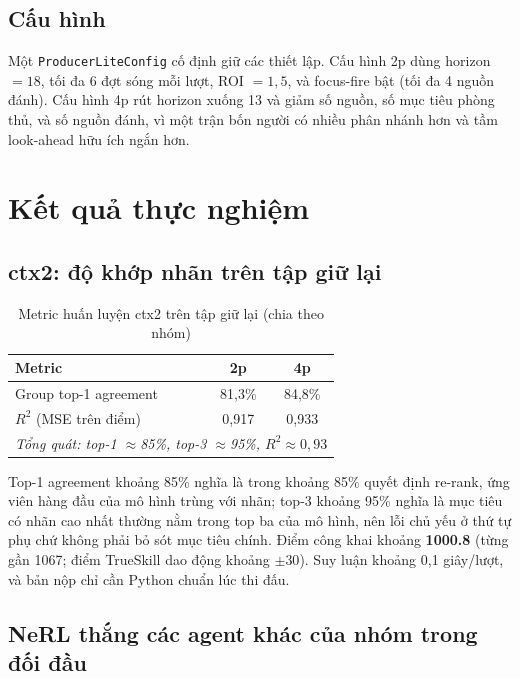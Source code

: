 \documentclass[conference]{IEEEtran}
\begin{document}
\subsection{Cấu hình}
Một \texttt{ProducerLiteConfig} cố định giữ các thiết lập. Cấu hình 2p dùng horizon $=18$, tối đa 6 đợt sóng mỗi lượt, ROI $=1{,}5$, và focus-fire bật (tối đa 4 nguồn đánh). Cấu hình 4p rút horizon xuống 13 và giảm số nguồn, số mục tiêu phòng thủ, và số nguồn đánh, vì một trận bốn người có nhiều phân nhánh hơn và tầm look-ahead hữu ích ngắn hơn.

\section{Kết quả thực nghiệm}
\label{sec:results}

\subsection{ctx2: độ khớp nhãn trên tập giữ lại}

\begin{table}[htbp]
\caption{Metric huấn luyện ctx2 trên tập giữ lại (chia theo nhóm)}
\label{tab:metrics}
\centering
\begin{tabular}{lcc}
\toprule
\textbf{Metric} & \textbf{2p} & \textbf{4p} \\
\midrule
Group top-1 agreement & 81{,}3\% & 84{,}8\% \\
$R^2$ (MSE trên điểm) & 0{,}917 & 0{,}933 \\
\midrule
\multicolumn{3}{l}{\textit{Tổng quát: top-1 $\approx$85\%, top-3 $\approx$95\%, $R^2 \approx 0{,}93$}} \\
\bottomrule
\end{tabular}
\end{table}

Top-1 agreement khoảng 85\% nghĩa là trong khoảng 85\% quyết định re-rank, ứng viên hàng đầu của mô hình trùng với nhãn; top-3 khoảng 95\% nghĩa là mục tiêu có nhãn cao nhất thường nằm trong top ba của mô hình, nên lỗi chủ yếu ở thứ tự phụ chứ không phải bỏ sót mục tiêu chính. Điểm công khai khoảng \textbf{1000.8} (từng gần 1067; điểm TrueSkill dao động khoảng $\pm 30$). Suy luận khoảng 0{,}1 giây/lượt, và bản nộp chỉ cần Python chuẩn lúc thi đấu.

\subsection{NeRL thắng các agent khác của nhóm trong đối đầu}
\end{document}

